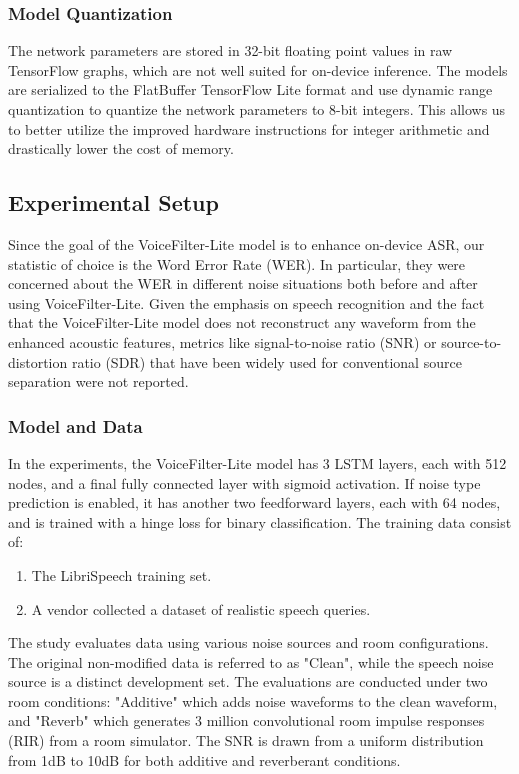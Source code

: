 \subsubsection{Model Quantization}
The network parameters are stored in 32-bit floating point values in raw TensorFlow graphs, which are not well suited for on-device inference. The models are serialized to the FlatBuffer TensorFlow Lite format and use dynamic range quantization to quantize the network parameters to 8-bit integers. This allows us to better utilize the improved hardware instructions for integer arithmetic and drastically lower the cost of memory.

\subsection{Experimental Setup}
Since the goal of the VoiceFilter-Lite model is to enhance on-device ASR, our statistic of choice is the Word Error Rate (WER). In particular, they were concerned about the WER in different noise situations both before and after using VoiceFilter-Lite. Given the emphasis on speech recognition and the fact that the VoiceFilter-Lite model does not reconstruct any waveform from the enhanced acoustic features, metrics like signal-to-noise ratio (SNR) or source-to-distortion ratio (SDR) that have been widely used for conventional source separation were not reported.

\subsubsection{Model and Data}
In the experiments, the VoiceFilter-Lite model has 3 LSTM layers, each with 512 nodes, and a final fully connected layer with sigmoid activation. If noise type prediction is enabled, it has another two feedforward layers, each with 64 nodes, and is trained with a hinge loss for binary classification. The training data consist of:
\begin{enumerate}
  \item The LibriSpeech \cite{librispeech} training set.
  \item A vendor collected a dataset of realistic speech queries.
\end{enumerate}
The study evaluates data using various noise sources and room configurations. The original non-modified data is referred to as "Clean", while the speech noise source is a distinct development set. The evaluations are conducted under two room conditions: "Additive" which adds noise waveforms to the clean waveform, and "Reverb" which generates 3 million convolutional room impulse responses (RIR) from a room simulator. The SNR is drawn from a uniform distribution from 1dB to 10dB for both additive and reverberant conditions.

